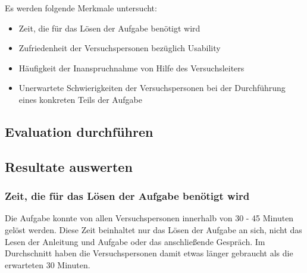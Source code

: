 Es werden folgende Merkmale untersucht:
\begin{itemize}
    \item Zeit, die für das Lösen der Aufgabe benötigt wird
    \item Zufriedenheit der Versuchspersonen bezüglich Usability
    \item Häufigkeit der Inanspruchnahme von Hilfe des Versuchsleiters
    \item Unerwartete Schwierigkeiten der Versuchspersonen bei der Durchführung eines konkreten Teils der Aufgabe
\end{itemize}

\subsection{Evaluation durchführen}

\subsection{Resultate auswerten}

\subsubsection{Zeit, die für das Lösen der Aufgabe benötigt wird}
Die Aufgabe konnte von allen Versuchspersonen innerhalb von 30 - 45 Minuten gelöst werden. Diese Zeit beinhaltet nur das Lösen der Aufgabe an sich, nicht das Lesen der Anleitung und Aufgabe oder das anschließende Gespräch. Im Durchschnitt haben die Versuchspersonen damit etwas länger gebraucht als die erwarteten 30 Minuten.

